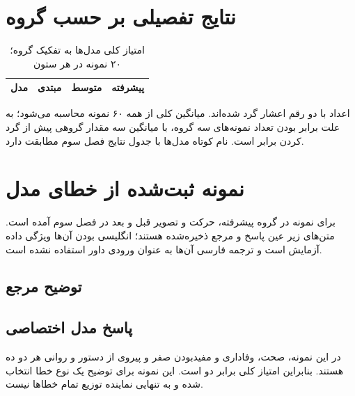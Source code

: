 \section{نتایج تفصیلی بر حسب گروه}
\begin{table}[htbp]
\centering\small
\caption{امتیاز کلی مدل‌ها به تفکیک گروه؛ ۲۰ نمونه در هر ستون}
\begin{tabular}{lrrr}
\toprule
مدل & مبتدی & متوسط & پیشرفته \\
\midrule

\bottomrule
\end{tabular}
\end{table}
اعداد با دو رقم اعشار گرد شده‌اند. میانگین کلی از همه ۶۰ نمونه محاسبه می‌شود؛ به علت برابر بودن تعداد نمونه‌های سه گروه، با میانگین سه مقدار گروهی پیش از گرد کردن برابر است. نام کوتاه مدل‌ها با جدول نتایج فصل سوم مطابقت دارد.

\section{نمونه ثبت‌شده از خطای مدل}
برای نمونه  در گروه پیشرفته، حرکت  و تصویر قبل و بعد در فصل سوم آمده است. متن‌های زیر عین پاسخ و مرجع ذخیره‌شده هستند؛ انگلیسی بودن آن‌ها ویژگی داده آزمایش است و ترجمه فارسی آن‌ها به عنوان ورودی داور استفاده نشده است.
\subsection*{توضیح مرجع}
\begin{latin}\small

\end{latin}
\subsection*{پاسخ مدل اختصاصی}
\begin{latin}\small

\end{latin}
در این نمونه، صحت، وفاداری و مفیدبودن صفر و پیروی از دستور و روانی هر دو ده هستند. بنابراین امتیاز کلی برابر دو است. این نمونه برای توضیح یک نوع خطا انتخاب شده و به تنهایی نماینده توزیع تمام خطاها نیست.

